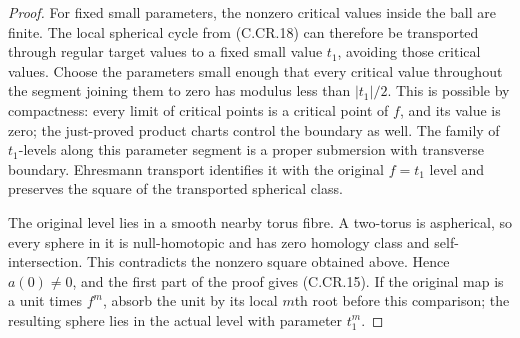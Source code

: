 \begin{proof}
For fixed small parameters, the nonzero critical
values inside the ball are finite. The local
spherical cycle from (C.CR.18) can therefore be transported
through regular target values to a fixed small
value $t_1$, avoiding those critical values.
Choose the parameters small enough that every
critical value throughout the segment joining
them to zero has modulus less than $|t_1|/2$.
This is possible by compactness: every limit of
critical points is a critical point of $f$, and
its value is zero; the just-proved product charts
control the boundary as well. The family of
$t_1$-levels along this parameter segment is a
proper submersion with transverse boundary.
Ehresmann transport identifies it with the
original $f=t_1$ level and preserves the square
of the transported spherical class.

The original level lies in a smooth nearby torus
fibre. A two-torus is aspherical, so every sphere
in it is null-homotopic and has zero homology
class and self-intersection. This contradicts
the nonzero square obtained above. Hence $a(0)\ne0$,
and the first part of the proof gives (C.CR.15).
If the original map is a unit times $f^m$, absorb
the unit by its local $m$th root before this
comparison; the resulting sphere lies in the
actual level with parameter $t_1^m$.
\end{proof}



